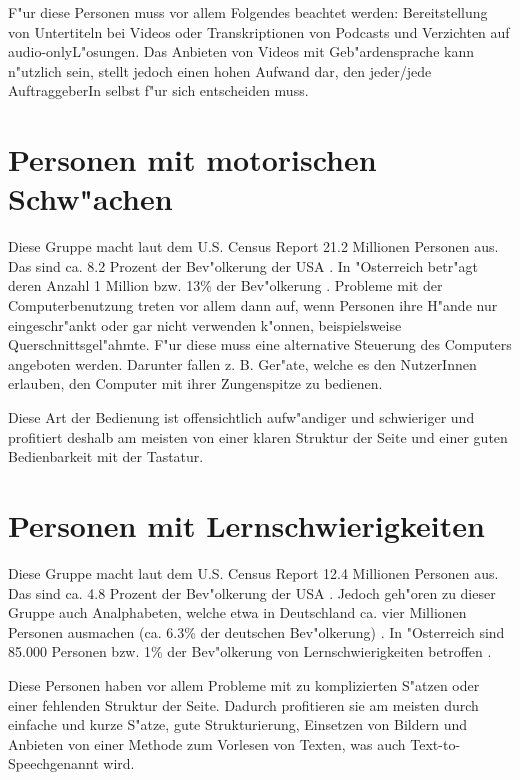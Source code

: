 \documentclass[a4paper,bibtotoc,oneside]{scrbook}
\begin{document}
F"ur diese Personen muss vor allem Folgendes beachtet werden: Bereitstellung von Untertiteln bei Videos oder Transkriptionen von Podcasts und Verzichten auf \glqq audio-only\grqq L"osungen. Das Anbieten von Videos mit Geb"ardensprache kann n"utzlich sein, stellt jedoch einen hohen Aufwand dar, den jeder/jede AuftraggeberIn selbst f"ur sich entscheiden muss. \cite[S. 17]{barr_webd}\cite[S. 20]{understand_acc}

\section{Personen mit motorischen Schw"achen}
Diese Gruppe macht laut dem U.S. Census Report 21.2 Millionen Personen aus. Das
sind ca. 8.2 Prozent der Bev"olkerung der USA \cite[S. 1]{us_cens}. In "Osterreich betr"agt deren Anzahl 1 Million bzw. 13\% der Bev"olkerung \cite[S. 12]{stat_austria}. Probleme mit der Computerbenutzung treten vor allem dann auf, wenn Personen ihre H"ande nur eingeschr"ankt oder gar nicht verwenden k"onnen, beispielsweise Querschnittsgel"ahmte. F"ur diese muss eine alternative Steuerung des Computers angeboten werden. Darunter fallen z. B. Ger"ate, welche es den NutzerInnen erlauben, den Computer mit ihrer Zungenspitze zu bedienen.\cite[S. 15-16]{barr_webd}

Diese Art der Bedienung ist offensichtlich aufw"andiger und schwieriger und profitiert deshalb am meisten von einer klaren Struktur der Seite und einer guten Bedienbarkeit mit der Tastatur.\cite[S. 15-16]{barr_webd}\cite[S. 18]{understand_acc}

\section{Personen mit Lernschwierigkeiten}
Diese Gruppe macht laut dem U.S. Census Report 12.4 Millionen Personen aus. Das
sind ca. 4.8 Prozent der Bev"olkerung der USA \cite[S. 1]{us_cens}. Jedoch geh"oren zu dieser Gruppe auch Analphabeten, welche etwa in Deutschland ca. vier Millionen Personen ausmachen (ca. 6.3\% der deutschen Bev"olkerung) \cite[S. 19]{understand_acc}. In "Osterreich sind 85.000 Personen bzw. 1\% der Bev"olkerung von Lernschwierigkeiten betroffen \cite[S. 14]{stat_austria}.

Diese Personen haben vor allem Probleme mit zu komplizierten S"atzen oder einer fehlenden Struktur der Seite. Dadurch profitieren sie am meisten durch einfache und kurze S"atze, gute Strukturierung, Einsetzen von Bildern und Anbieten von einer Methode zum Vorlesen von Texten, was auch \glqq Text-to-Speech\grqq genannt wird. \cite[S. 18-19]{barr_webd}\cite[S. 19]{understand_acc}
\end{document}
